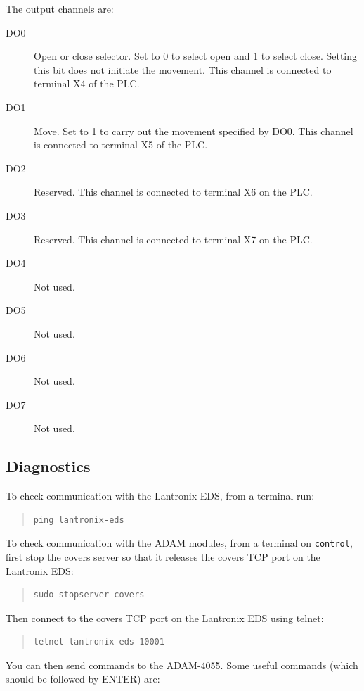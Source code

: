 The output channels are:
\begin{description}
\item[DO0] Open or close selector. Set to 0 to select open and 1 to select close. Setting this bit does not initiate the movement.
This channel is connected to terminal X4 of the PLC.
\item[DO1] Move. Set to 1 to carry out the movement specified by DO0. This channel is connected to terminal X5 of the PLC.
\item[DO2] Reserved. This channel is connected to terminal X6 on the PLC.
\item[DO3] Reserved. This channel is connected to terminal X7 on the PLC.
\item[DO4] Not used.
\item[DO5] Not used.
\item[DO6] Not used.
\item[DO7] Not used.
\end{description}

\subsection{Diagnostics}

To check communication with the Lantronix EDS, from a terminal run:

\begin{quotation}
\begin{verbatim}
ping lantronix-eds
\end{verbatim}
\end{quotation}

To check communication with the ADAM modules, from a terminal on \verb|control|, first stop the covers server so that it releases the covers TCP port on the Lantronix EDS:

\begin{quotation}
\begin{verbatim}
sudo stopserver covers
\end{verbatim}
\end{quotation}

Then connect to the covers TCP port on the Lantronix EDS using telnet:

\begin{quotation}
\begin{verbatim}
telnet lantronix-eds 10001
\end{verbatim}
\end{quotation}

You can then send commands to the ADAM-4055. Some useful commands (which should be followed by ENTER) are:

